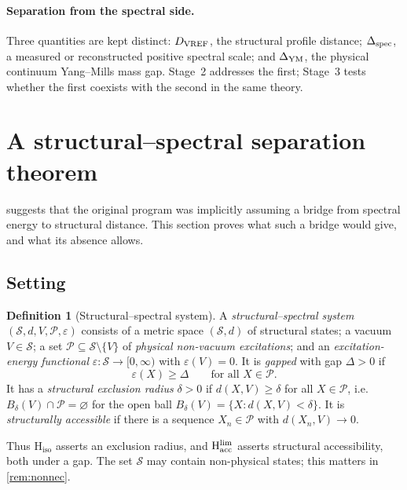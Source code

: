 \documentclass[11pt,a4paper]{article}
\theoremstyle{definition}
\newtheorem{definition}{Definition}
\theoremstyle{remark}
\newcommand{\Pset}{\mathcal{P}}
\newcommand{\Hacc}{\mathrm{H}_{\mathrm{acc}}}
\newcommand{\Hiso}{\mathrm{H}_{\mathrm{iso}}}
\begin{document}
\paragraph{Separation from the spectral side.} Three quantities are kept distinct: $D_{\rm VREF}$, the structural profile distance; $\Delta_{\rm spec}$, a measured or reconstructed positive spectral scale; and $\Delta_{\rm YM}$, the physical continuum Yang--Mills mass gap. Stage~2 addresses the first; Stage~3 tests whether the first coexists with the second in the same theory.

\section{A structural--spectral separation theorem}\label{sec:theorem}

 suggests that the original program was implicitly assuming a bridge from spectral energy to structural distance. This section proves what such a bridge would give, and what its absence allows.

\subsection{Setting}
\begin{definition}[Structural--spectral system]
A \emph{structural--spectral system} $(\mathcal S,d,V,\Pset,\varepsilon)$ consists of a metric space $(\mathcal S,d)$ of structural states; a vacuum $V\in\mathcal S$; a set $\Pset\subseteq\mathcal S\setminus\{V\}$ of \emph{physical non-vacuum excitations}; and an \emph{excitation-energy functional} $\varepsilon:\mathcal S\to[0,\infty)$ with $\varepsilon(V)=0$. It is \emph{gapped} with gap $\Delta>0$ if
\begin{equation}\label{eq:gap}
\varepsilon(X)\ge\Delta\qquad\text{for all }X\in\Pset .
\end{equation}
It has a \emph{structural exclusion radius} $\delta>0$ if $d(X,V)\ge\delta$ for all $X\in\Pset$, i.e.\ $B_\delta(V)\cap\Pset=\varnothing$ for the open ball $B_\delta(V)=\{X:d(X,V)<\delta\}$. It is \emph{structurally accessible} if there is a sequence $X_n\in\Pset$ with $d(X_n,V)\to0$.
\end{definition}
Thus $\Hiso$ asserts an exclusion radius, and $\Hacc^{\rm lim}$ asserts structural accessibility, both under a gap. The set $\mathcal S$ may contain non-physical states; this matters in \cref{rem:nonnec}.
\end{document}

